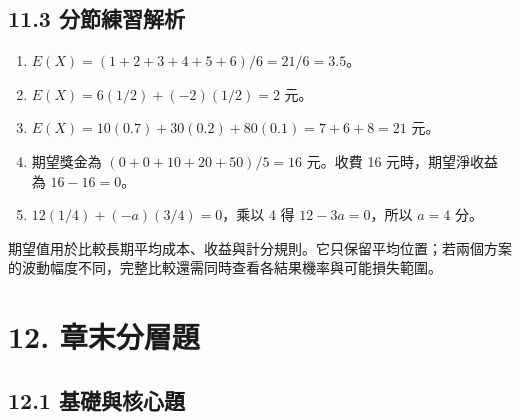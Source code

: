 \documentclass[11pt,a4paper]{article}
\providecommand{\tightlist}{%
  \setlength{\itemsep}{0pt}\setlength{\parskip}{0pt}}
\begin{document}
\subsection{11.3 分節練習解析}\label{ux5206ux7bc0ux7df4ux7fd2ux89e3ux6790-10}

\begin{enumerate}
\def\labelenumi{\arabic{enumi}.}
\tightlist
\item
  \(E(X)=(1+2+3+4+5+6)/6=21/6=3.5\)。
\item
  \(E(X)=6(1/2)+(-2)(1/2)=2\) 元。
\item
  \(E(X)=10(0.7)+30(0.2)+80(0.1)=7+6+8=21\) 元。
\item
  期望獎金為 \((0+0+10+20+50)/5=16\) 元。收費 16 元時，期望淨收益為 \(16-16=0\)。
\item
  \(12(1/4)+(-a)(3/4)=0\)，乘以 4 得 \(12-3a=0\)，所以 \(a=4\) 分。
\end{enumerate}

期望值用於比較長期平均成本、收益與計分規則。它只保留平均位置；若兩個方案的波動幅度不同，完整比較還需同時查看各結果機率與可能損失範圍。

\section{12. 章末分層題}\label{ux7ae0ux672bux5206ux5c64ux984c}

\subsection{12.1 基礎與核心題}\label{ux57faux790eux8207ux6838ux5fc3ux984c}
\end{document}
